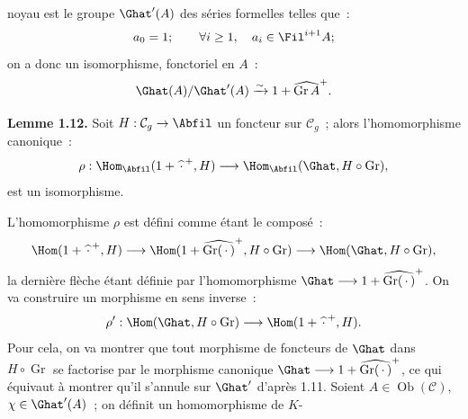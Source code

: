noyau est le groupe \(\Ghat'(A)\) des séries formelles telles que~:
\[
  a_0=1;\qquad \forall i\geq1,\quad a_i\in\Fil^{i+1}A;
\]
on a donc un isomorphisme, fonctoriel en \(A\)~:
\[
  \Ghat(A)/\Ghat'(A)\xrightarrow{\sim}1+\widehat{\operatorname{Gr}A}^{+}.
\]

\textbf{Lemme 1.12.} Soit \(H:\mathcal C_g\to\Abfil\) un foncteur sur \(\mathcal C_g\)~; alors l'homomorphisme canonique~:
\[
  \rho:\Hom_{\Abfil}(1+\widehat{\,\cdot\,}^{+},H)
  \longrightarrow
  \Hom_{\Abfil}(\Ghat,H\circ\operatorname{Gr}),
\]
est un isomorphisme.

L'homomorphisme \(\rho\) est défini comme étant le composé~:
\[
  \Hom(1+\widehat{\,\cdot\,}^{+},H)
  \longrightarrow
  \Hom(1+\widehat{\operatorname{Gr}(\,\cdot\,)}^{+},H\circ\operatorname{Gr})
  \longrightarrow
  \Hom(\Ghat,H\circ\operatorname{Gr}),
\]
la dernière flèche étant définie par l'homomorphisme \(\Ghat\longrightarrow1+\widehat{\operatorname{Gr}(\,\cdot\,)}^{+}\).
On va construire un morphisme en sens inverse~:
\[
  \rho':\Hom(\Ghat,H\circ\operatorname{Gr})
  \longrightarrow
  \Hom(1+\widehat{\,\cdot\,}^{+},H).
\]
Pour cela, on va montrer que tout morphisme de foncteurs de \(\Ghat\) dans \(H\circ\operatorname{Gr}\) se factorise par le morphisme canonique \(\Ghat\longrightarrow1+\widehat{\operatorname{Gr}(\,\cdot\,)}^{+}\), ce qui équivaut à montrer qu'il s'annule sur \(\Ghat'\) d'après 1.11. Soient \(A\in\operatorname{Ob}(\mathcal C)\), \(\chi\in\Ghat'(A)\)~; on définit un homomorphisme de \(K\)-
